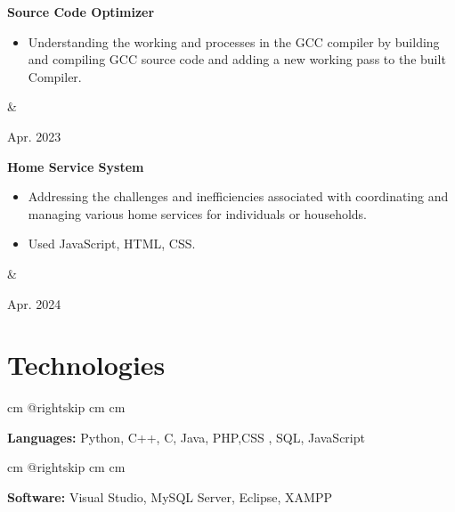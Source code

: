 \documentclass[12pt, letterpaper]{article}
\newenvironment{highlights}{
        \begin{itemize}[
                topsep=0pt,
                parsep=0.10 cm,
                partopsep=0pt,
                itemsep=0pt,
                after=\vspace{-1\baselineskip},
                leftmargin=0.4 cm + 3pt
            ]
    }{
        \end{itemize}
    } %
\let\originalTabularx\tabularx
\let\originalEndTabularx\endtabularx
\renewenvironment{tabularx}{\bgroup\centering\originalTabularx}{\originalEndTabularx\par\egroup}
\begin{document}
        \begin{tabularx}{
            \textwidth-0.4 cm-0.13cm
        }{
            K{0.2 cm}
            R{4.1 cm}
        }
            \textbf{Source Code Optimizer}

            \vspace{0.10 cm}

            \begin{highlights}
                \item Understanding the working and processes in the GCC compiler by building and compiling GCC source code and adding a new working pass to the built Compiler.
            \end{highlights}
            &
            

            Apr. 2023
        \end{tabularx}


        \vspace{0.2 cm}
        \begin{tabularx}{
            \textwidth-0.4 cm-0.13cm
        }{
            K{0.2 cm}
            R{4.1 cm}
        }
            \textbf{Home Service System}

            \vspace{0.10 cm}

            \begin{highlights}
                \item Addressing the challenges and inefficiencies associated with coordinating and managing various home services for individuals or households.
                \item Used JavaScript, HTML, CSS.
            \end{highlights}
            &
            

            Apr. 2024
        \end{tabularx}


        \vspace{0.2 cm}

    
    \section{Technologies}

        \begingroup{} cm
        \advance\csname @rightskip cm
        \advance{} cm

        \textbf{Languages:} Python, C++, C, Java, PHP,CSS , SQL, JavaScript \par\endgroup

        \vspace{0.2 cm}
        \begingroup{} cm
        \advance\csname @rightskip cm
        \advance{} cm

        \textbf{Software:} Visual Studio, MySQL Server, Eclipse, XAMPP  \par\endgroup


    
\end{document}
